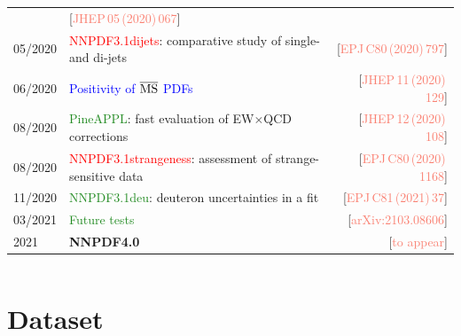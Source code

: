 \documentclass[aspectratio=169,9pt]{beamer}
\begin{document}
\begin{frame}
\begin{columns}
\begin{tabularx}{\textwidth}{lXr}
	          & {\tiny{[{\textcolor{salmon}{JHEP\,05\,(2020)\,067}}]}}\\
	  05/2020 & \textcolor{red}{NNPDF3.1dijets}: {\scriptsize comparative study of single- and di-jets}                                             
	          & {\tiny{[{\textcolor{salmon}{EPJ\,C80\,(2020)\,797}}]}}\\
	  06/2020 & \textcolor{blue}{Positivity of $\overline{\rm MS}$ PDFs}                    
	          & {\tiny{[{\textcolor{salmon}{JHEP\,11\,(2020)\,129}}]}}\\
	  08/2020 & \textcolor{forestgreen}{PineAPPL}: {\scriptsize fast evaluation of EW$\times$QCD corrections}                                           
	          & {\tiny{[{\textcolor{salmon}{JHEP\,12\,(2020)\,108}}]}}\\
	  08/2020 & \textcolor{red}{NNPDF3.1strangeness}: {\scriptsize assessment of strange-sensitive data}                                        
	          & {\tiny{[{\textcolor{salmon}{EPJ\,C80\,(2020)\,1168}}]}}\\
	  11/2020 & \textcolor{forestgreen}{NNPDF3.1deu}: {\scriptsize deuteron uncertainties in a fit}                                        
	          & {\tiny{[{\textcolor{salmon}{EPJ\,C81\,(2021)\,37}}]}}\\
	  03/2021 & \textcolor{forestgreen}{Future tests}                                       
	          & {\tiny{[{\textcolor{salmon}{arXiv:2103.08606}}]}}\\
	  2021    & {\bf NNPDF4.0}                                                              
	          & {\tiny{[{\textcolor{salmon}{to appear}}]}}\\
	 \end{tabularx}
    \end{columns}
\end{frame}


\section*{Dataset}
\end{document}

